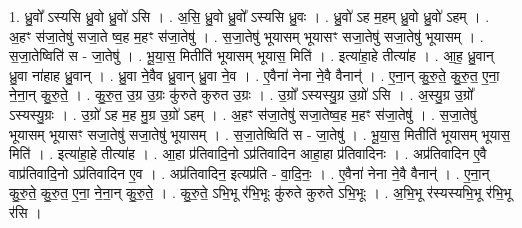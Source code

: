 \documentclass[17pt]{extarticle}
\begin{document}
1. ध्रु॒वो᳚ ऽस्यसि ध्रु॒वो ध्रु॒वो॑ ऽसि । . अ॒सि॒ ध्रु॒वो ध्रु॒वो᳚ ऽस्यसि ध्रु॒वः । . ध्रु॒वो॑ ऽह म॒हम् ध्रु॒वो ध्रु॒वो॑ ऽहम् । . अ॒हꣳ स॑जा॒तेषु॑ सजा॒ते ष्व॒ह म॒हꣳ स॑जा॒तेषु॑ । . स॒जा॒तेषु॑ भूयासम् भूयासꣳ सजा॒तेषु॑ सजा॒तेषु॑ भूयासम् । . स॒जा॒तेष्विति॑ स - जा॒तेषु॑ । . भू॒या॒स॒ मितीति॑ भूयासम् भूयास॒ मिति॑ । . इत्या॑हा॒हे तीत्या॑ह । . आ॒ह॒ ध्रु॒वान् ध्रु॒वा ना॑हाह ध्रु॒वान् । . ध्रु॒वा ने॒वैव ध्रु॒वान् ध्रु॒वा ने॒व । . ए॒वैना॑ नेना ने॒वै वैनान्॑ । . ए॒ना॒न् कु॒रु॒ते॒ कु॒रु॒त॒ ए॒ना॒ ने॒ना॒न् कु॒रु॒ते॒ । . कु॒रु॒त॒ उ॒ग्र उ॒ग्रः कु॑रुते कुरुत उ॒ग्रः । . उ॒ग्रो᳚ ऽस्यस्यु॒ग्र उ॒ग्रो॑ ऽसि । . अ॒स्यु॒ग्र उ॒ग्रो᳚ ऽस्यस्यु॒ग्रः । . उ॒ग्रो॑ ऽह म॒ह मु॒ग्र उ॒ग्रो॑ ऽहम् । . अ॒हꣳ स॑जा॒तेषु॑ सजा॒तेष्व॒ह म॒हꣳ स॑जा॒तेषु॑ । . स॒जा॒तेषु॑ भूयासम् भूयासꣳ सजा॒तेषु॑ सजा॒तेषु॑ भूयासम् । . स॒जा॒तेष्विति॑ स - जा॒तेषु॑ । . भू॒या॒स॒ मितीति॑ भूयासम् भूयास॒ मिति॑ । . इत्या॑हा॒हे तीत्या॑ह । . आ॒हा प्र॑तिवादि॒नो ऽप्र॑तिवादिन आहा॒हा प्र॑तिवादिनः । . अप्र॑तिवादिन ए॒वै वाप्र॑तिवादि॒नो ऽप्र॑तिवादिन ए॒व । . अप्र॑तिवादिन॒ इत्यप्र॑ति - वा॒दि॒नः॒ । . ए॒वैना॑ नेना ने॒वै वैनान्॑ । . ए॒ना॒न् कु॒रु॒ते॒ कु॒रु॒त॒ ए॒ना॒ ने॒ना॒न् कु॒रु॒ते॒ । . कु॒रु॒ते॒ ऽभि॒भू र॑भि॒भूः कु॑रुते कुरुते ऽभि॒भूः । . अ॒भि॒भू र॑स्यस्यभि॒भू र॑भि॒भू र॑सि । \newline
\end{document}
